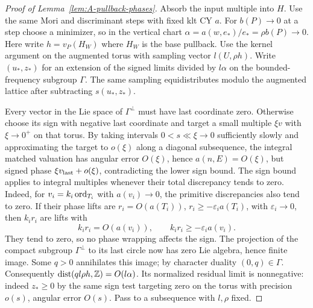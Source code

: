 \begin{proof}[Proof of Lemma~\ref{lem:A-pullback-phases}] Absorb the input multiple into \(H\).
Use the same Mori and discriminant steps with fixed klt CY \(a\).
For \(b(P)\to0\) at a step choose a minimizer, so in the vertical chart \(\alpha=a(w,e_*)/e_*=\rho b(P)\to0\).
Here write \(h=v_P(H_W)\) where \(H_W\) is the base pullback.
Use the kernel argument on the augmented torus with sampling vector \(l(U,\rho h)\).
Write \((u_*,z_*)\) for an extension of the signed limits divided by \(l\alpha\) on the bounded-frequency subgroup \(\Gamma\).
The same sampling equidistributes modulo the augmented lattice after subtracting \(s(u_*,z_*)\).

Every vector in the Lie space of \(\Gamma^\perp\) must have last coordinate zero.
Otherwise choose its sign with negative last coordinate and target a small multiple \(\xi v\) with \(\xi\to0^+\) on that torus.
By taking intervals \(0<s\ll\xi\to0\) sufficiently slowly and approximating the target to \(o(\xi)\) along a diagonal subsequence, the integral matched valuation has angular error \(O(\xi)\), hence \(a(n,E)=O(\xi)\), but signed phase \(\xi v_{\rm last}+o(\xi)\), contradicting the lower sign bound.
The sign bound applies to integral multiples whenever their total
discrepancy tends to zero.  Indeed, for \(v_i=k_i\operatorname{ord}_{T_i}\) with
\(a(v_i)\to0\), the primitive discrepancies also tend to zero.
If their phase lifts are
\(r_i=O(a(T_i))\), \(r_i\ge-\varepsilon_i a(T_i)\), with
\(\varepsilon_i\to0\), then \(k_i r_i\) are lifts with
\[
 k_i r_i=O(a(v_i)),\qquad
 k_i r_i\ge-\varepsilon_i a(v_i).
\]
They tend to zero, so no phase wrapping affects the sign.
The projection of the compact subgroup \(\Gamma^\perp\) to its
last circle now has zero Lie algebra, hence finite image.
Some \(q>0\) annihilates this image; by character duality
\((0,q)\in\Gamma\).  Consequently
\({\rm dist}(q l\rho h,\mathbb Z)=O(l\alpha)\).
Its normalized residual limit is nonnegative: indeed \(z_*\ge0\) by the same sign test targeting zero on the torus with precision \(o(s)\), angular error \(O(s)\).
Pass to a subsequence with \(l,\rho\) fixed.


\end{proof}
